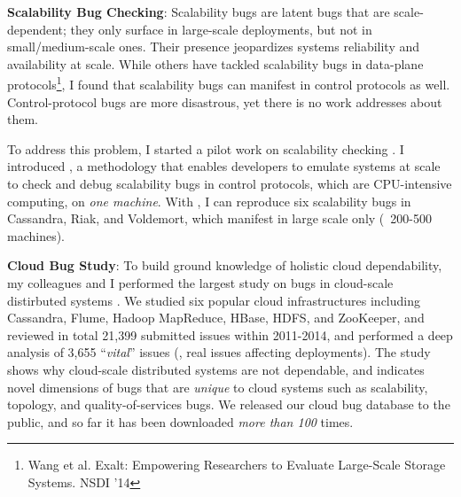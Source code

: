 \documentclass[10pt]{article}
\begin{document}
\noindent
\textbf{Scalability Bug Checking}: Scalability bugs are latent bugs that are
scale-dependent; they only surface in large-scale deployments, but not in
small/medium-scale ones. Their presence jeopardizes systems reliability and
availability at scale. 
%
While others have tackled scalability bugs in data-plane protocols\footnote{Wang et al.
Exalt: Empowering Researchers to Evaluate Large-Scale Storage Systems. NSDI
'14}, I found that scalability bugs can manifest in control protocols as well.
Control-protocol bugs are more disastrous, yet there is no work addresses about
them.
 
To address this problem, I started a pilot work on scalability checking
\cite{Gunawi+17-SCk-Insub,Leesatapornwongsa+17-SCk-InPrep}. I introduced \sck, a
methodology that enables developers to emulate systems at scale to check and
debug scalability bugs in control protocols, which are CPU-intensive computing,
on \textit{one machine}. 
%
With \sck, I can reproduce six scalability bugs in Cassandra, Riak, and
Voldemort, which manifest in large scale only (\eg\ 200-500 machines). 


\noindent
\textbf{Cloud Bug Study}: To build ground knowledge of holistic cloud
dependability, my colleagues and I performed the largest study on bugs in
cloud-scale distirbuted systems \cite{Gunawi+14-Cbs}. We studied six popular
cloud infrastructures including Cassandra, Flume, Hadoop MapReduce, HBase, HDFS,
and ZooKeeper, and reviewed in total 21,399 submitted issues within 2011-2014,
and performed a deep analysis of 3,655 ``\textit{vital}'' issues (\ie, real
issues affecting deployments). The study shows why cloud-scale distributed
systems are not dependable, and indicates novel dimensions of bugs that are
\textit{unique} to cloud systems such as scalability, topology, and
quality-of-services bugs. We released our cloud bug database to the public, and
so far it has been downloaded \textit{more than 100} times.


\end{document}
